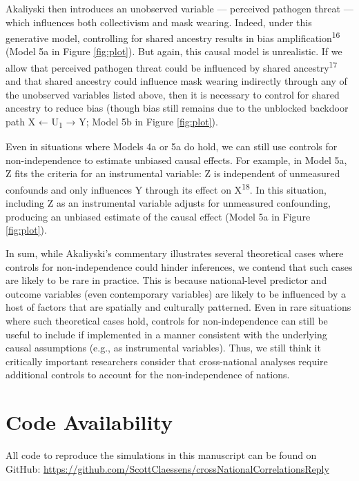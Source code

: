 \documentclass[
  man, donotrepeattitle,floatsintext]{apa6}
\begin{document}
Akaliyski then introduces an unobserved variable --- perceived pathogen threat
--- which influences both collectivism and mask wearing. Indeed, under this
generative model, controlling for shared ancestry results in bias
amplification\textsuperscript{16} (Model 5a in Figure \ref{fig:plot}).
But again, this causal model is unrealistic. If we allow that perceived pathogen
threat could be influenced by shared ancestry\textsuperscript{17} and that shared
ancestry could influence mask wearing indirectly through any of the unobserved
variables listed above, then it is necessary to control for shared ancestry to
reduce bias (though bias still remains due to the unblocked backdoor path
X ← U\textsubscript{1} → Y; Model 5b in Figure \ref{fig:plot}).

Even in situations where Models 4a or 5a do hold, we can still use controls for
non-independence to estimate unbiased causal effects. For example, in Model 5a,
Z fits the criteria for an instrumental variable: Z is independent of unmeasured
confounds and only influences Y through its effect on X\textsuperscript{18}. In this
situation, including Z as an instrumental variable adjusts for unmeasured
confounding, producing an unbiased estimate of the causal effect (Model 5a in
Figure \ref{fig:plot}).

In sum, while Akaliyski's commentary illustrates several theoretical cases
where controls for non-independence could hinder inferences, we contend that
such cases are likely to be rare in practice. This is because national-level
predictor and outcome variables (even contemporary variables) are likely to be
influenced by a host of factors that are spatially and culturally patterned.
Even in rare situations where such theoretical cases hold, controls for
non-independence can still be useful to include if implemented in a manner
consistent with the underlying causal assumptions (e.g., as instrumental
variables). Thus, we still think it critically important researchers consider
that cross-national analyses require additional controls to account for the
non-independence of nations.

\newpage
\nolinenumbers

\hypertarget{code-availability}{%
\section{Code Availability}\label{code-availability}}

All code to reproduce the simulations in this manuscript can be found on
GitHub: \url{https://github.com/ScottClaessens/crossNationalCorrelationsReply}
\end{document}
